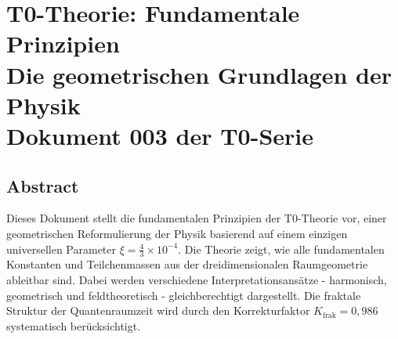 \chapter{\textbf{T0-Theorie: Fundamentale Prinzipien}\\[0.5cm]
	 Die geometrischen Grundlagen der Physik\\[0.3cm]
	\normalsize Dokument 003 der T0-Serie}

	
	
\section*{Abstract}
		Dieses Dokument stellt die fundamentalen Prinzipien der T0-Theorie vor, einer geometrischen Reformulierung der Physik basierend auf einem einzigen universellen Parameter $\xi = \frac{4}{3} \times 10^{-4}$. Die Theorie zeigt, wie alle fundamentalen Konstanten und Teilchenmassen aus der dreidimensionalen Raumgeometrie ableitbar sind. Dabei werden verschiedene Interpretationsansätze - harmonisch, geometrisch und feldtheoretisch - gleichberechtigt dargestellt. Die fraktale Struktur der Quantenraumzeit wird durch den Korrekturfaktor $K_{\text{frak}} = 0{,}986$ systematisch berücksichtigt.

